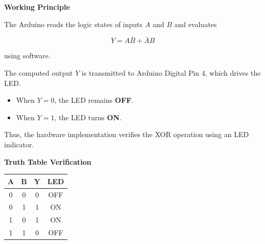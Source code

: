 \documentclass[12pt,a4paper]{article}
\renewcommand{\arraystretch}{1.4}
\begin{document}
\begin{hardwarebox}
\vspace{0.3cm}

\textbf{Working Principle}

The Arduino reads the logic states of inputs $A$ and $B$ and evaluates

\[
Y=A\bar B+\bar AB
\]

using software.

The computed output $Y$ is transmitted to Arduino Digital Pin 4, which drives the LED.

\begin{itemize}
\item When $Y=0$, the LED remains \textbf{OFF}.
\item When $Y=1$, the LED turns \textbf{ON}.
\end{itemize}

Thus, the hardware implementation verifies the XOR operation using an LED indicator.

\vspace{0.3cm}

\textbf{Truth Table Verification}

\begin{center}
\renewcommand{\arraystretch}{1.3}
\begin{tabular}{|c|c|c|c|}
\hline
A & B & Y & LED \\
\hline
0 & 0 & 0 & OFF \\
0 & 1 & 1 & ON \\
1 & 0 & 1 & ON \\
1 & 1 & 0 & OFF \\
\hline
\end{tabular}
\end{center}

\end{hardwarebox}
\end{document}
